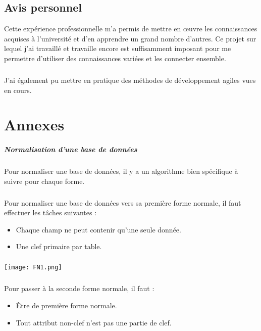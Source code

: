 \documentclass[a4paper,12pt,titlepage]{report}
\begin{document}
\newpage

\section{Avis personnel}


Cette expérience professionnelle m'a permis de mettre en œuvre les connaissances acquises à l'université et d'en apprendre un grand nombre d'autres. Ce projet sur lequel j'ai travaillé et travaille encore est suffisamment imposant pour me permettre d'utiliser des connaissances variées et les connecter ensemble.
\paragraph*{}
J'ai également pu mettre en pratique des méthodes de développement agiles vues en cours.


\chapter{Annexes}


\paragraph*{Normalisation d'une base de données}

Pour normaliser une base de données, il y a un algorithme bien spécifique à suivre pour chaque forme.
\paragraph*{}
Pour normaliser une base de données vers sa première forme normale, il faut effectuer les tâches suivantes :

\begin{itemize}
\item Chaque champ ne peut contenir qu'une seule donnée.
\item Une clef primaire par table.
\end{itemize}

\paragraph*{}

\texttt{[image: FN1.png]}

\newpage

\paragraph*{}
Pour passer à la seconde forme normale, il faut :
\begin{itemize}
\item Être de première forme normale.
\item Tout attribut non-clef n'est pas une partie de clef.
\end{itemize}
\end{document}
